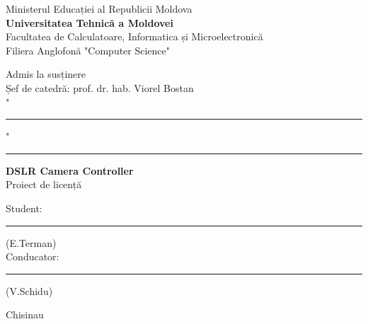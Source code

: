 \begin{titlepage}

\newcommand{\HRule}{\rule{\linewidth}{0.5mm}}

\center

Ministerul Educației al Republicii Moldova\\
\textbf{Universitatea Tehnică a Moldovei}\\
Facultatea de Calculatoare, Informatica și Microelectronică\\
Filiera Anglofonă "Computer Science"\\


\vspace{2cm}



\hfill Admis la susținere\\
\hfill Șef de catedră: prof. dr. hab. Viorel Bostan\\

\vspace{0.4cm}
\hfill "\rule{0.75cm}{0.2mm}" \ \rule{3cm}{0.2mm} \the\year
\vspace{3cm}




\begin{center}
\Large \textbf{DSLR Camera Controller}\\
\vspace{0.6cm}
Proiect de licență
\end{center}
\vspace{1cm}


\hfill Student: \rule{3.9cm}{0.2mm}(E.Terman)\\
\vspace{0.2cm}
\hfill Conducator: \rule{4cm}{0.2mm}(V.Schidu)\\
\vspace{0.2cm}

\vfill

\begin{center}
Chisinau \the\year
\end{center}

\end{titlepage}


